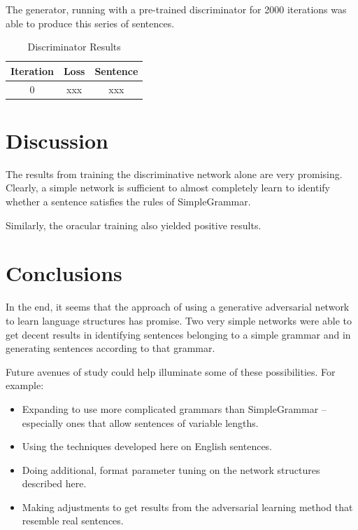 \documentclass[12pt]{article}
\begin{document}
The generator, running with a pre-trained discriminator for 2000 iterations was able to produce this series of sentences.

\begin{table}
    \centering
    \begin{tabular}{c|c|c}
        Iteration & Loss & Sentence \\
        \hline
        0 & xxx & xxx \\
    \end{tabular}
    \caption{Discriminator Results}
    \label{tab:disc_results}
\end{table}

\section{Discussion}

The results from training the discriminative network alone are very promising. Clearly, a simple network is sufficient to almost completely learn to identify whether a sentence satisfies the rules of SimpleGrammar.

Similarly, the oracular training also yielded positive results.

\section{Conclusions}

In the end, it seems that the approach of using a generative adversarial network to learn language structures has promise. Two very simple networks were able to get decent results in identifying sentences belonging to a simple grammar and in generating sentences according to that grammar.

Future avenues of study could help illuminate some of these possibilities. For example:

\begin{itemize}
    \item Expanding to use more complicated grammars than SimpleGrammar -- especially ones that allow sentences of variable lengths.
    \item Using the techniques developed here on English sentences.
    \item Doing additional, format parameter tuning on the network structures described here.
    \item Making adjustments to get results from the adversarial learning method that resemble real sentences.
\end{itemize}



\end{document}
